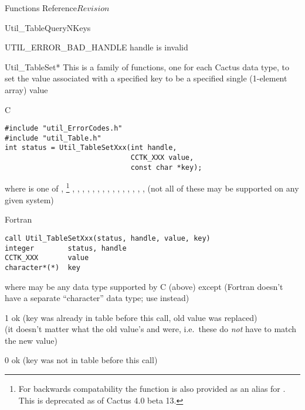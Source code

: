 \begin{cactuspart}{ Functions Reference}{}{$Revision$}
\begin{FunctionDescription}{Util\_TableQueryNKeys}
\begin{ErrorSection}
\begin{Error}{UTIL\_ERROR\_BAD\_HANDLE}
handle is invalid
\end{Error}
\end{ErrorSection}
\end{FunctionDescription}


\begin{FunctionDescription}{Util\_TableSet*}
\label{Util-TableSet*}
This is a family of functions, one for each Cactus data type,
to set the value associated with a specified key to be a specified
single (1-element array) value

\begin{SynopsisSection}
\begin{Synopsis}{C}
\begin{verbatim}
#include "util_ErrorCodes.h"
#include "util_Table.h"
int status = Util_TableSetXxx(int handle,
                              CCTK_XXX value,
                              const char *key);
\end{verbatim}
where  is one of
   , %
\footnote{%
	 For backwards compatability the function
	  is also provided
	 as an alias for .
	 This is deprecated as of Cactus 4.0 beta 13.
	 }%
,
   , ,
   , , , , ,
   , , , ,
   , , , 
(not all of these may be supported on any given system)
\end{Synopsis}
\begin{Synopsis}{Fortran}
\begin{verbatim}
call Util_TableSetXxx(status, handle, value, key)
integer        status, handle
CCTK_XXX       value
character*(*)  key
\end{verbatim}
where  may be any data type supported by C (above)
except  (Fortran doesn't have a separate ``character''
data type; use  instead)
\end{Synopsis}
\end{SynopsisSection}

\begin{ResultSection}
\begin{Result}{\rm 1}
ok (key was already in table before this call, old value was replaced)\\
   (it doesn't matter what the old value's  and
     were, i.e.\ these do {\em not\/} have to match
    the new value)
\end{Result}
\begin{Result}{\rm 0}
ok (key was not in table before this call)
\end{Result}
\end{ResultSection}


\end{FunctionDescription}
\end{cactuspart}
